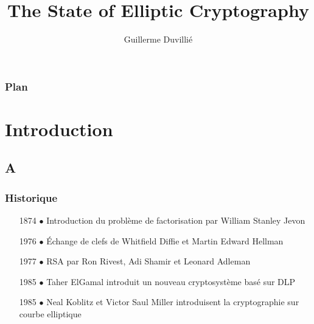 \documentclass[9pt]{beamer}
\title[Elliptic Curve Cryptography]{The State of Elliptic Cryptography}
\author[G. Duvillié]{Guillerme Duvillié}
\institute{Université Montpellier 2}
\begin{document}
\begin{frame}
    \titlepage
\end{frame}

\begin{frame}
    \frametitle{Plan}
    \tableofcontents
\end{frame}

\addtocounter{framenumber}{-2}

\section{Introduction}

\subsection*{A}

\begin{frame}
    \frametitle{Historique}
    \vfill
    \begin{itemize}
        \item[1874 $\bullet$] Introduction du problème de factorisation par William Stanley
            Jevon
            \vfill
        \item[1976 $\bullet$] Échange de clefs de Whitfield Diffie et Martin Edward Hellman
            \vfill
        \item[1977 $\bullet$] RSA par Ron Rivest, Adi Shamir et Leonard Adleman
            \vfill
        \item[1985 $\bullet$] Taher ElGamal introduit un nouveau cryptosystème basé sur DLP
            \vfill
        \item[1985 $\bullet$] Neal Koblitz et Victor Saul Miller introduisent la
            cryptographie sur courbe elliptique
            \vfill
    \end{itemize}
\end{frame}
\end{document}
